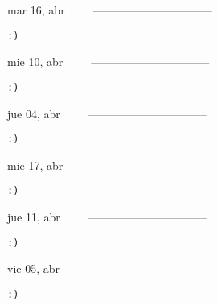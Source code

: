 \documentclass[letterpaper,10pt]{article}
\begin{document}
\begin{multicols}{3}
{mar 16, abr\ \ \ \ \ --------------------------------}
\begin{flushright}\begin{small}\texttt{:)}\end{small}\end{flushright}
\vfill
{mie 10, abr\ \ \ \ \ --------------------------------}
\begin{flushright}\begin{small}\texttt{:)}\end{small}\end{flushright}\par
\vfill
{jue 04, abr\ \ \ \ \ --------------------------------}
\begin{flushright}\begin{small}\texttt{:)}\end{small}\end{flushright}\par
\vfill
\end{multicols}
\vspace{1.05cm}

\begin{multicols}{3}
{mie 17, abr\ \ \ \ \ --------------------------------}
\begin{flushright}\begin{small}\texttt{:)}\end{small}\end{flushright}
\vfill
{jue 11, abr\ \ \ \ \ --------------------------------}
\begin{flushright}\begin{small}\texttt{:)}\end{small}\end{flushright}\par
\vfill
{vie 05, abr\ \ \ \ \ --------------------------------}
\begin{flushright}\begin{small}\texttt{:)}\end{small}\end{flushright}\par
\vfill
\end{multicols}
\vspace{1.05cm}
\end{document}
